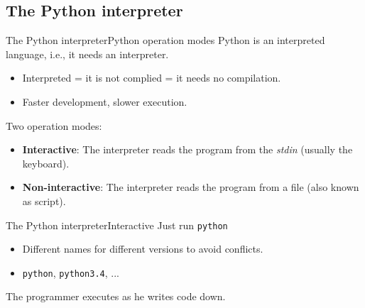 \documentclass[10pt,compress]{beamer} %
\begin{document}
\subsection{The Python interpreter}

\begin{frame}{The Python interpreter}{Python operation modes}
		Python is an interpreted language, i.e., it needs an interpreter.
			\begin{itemize}
				\item Interpreted = it is not complied = it needs no compilation.
				\item Faster development, slower execution.
			\end{itemize}
		Two operation modes:
			\begin{itemize}
				\item \textbf{Interactive}: The interpreter reads the program from the \textit{stdin} (usually the keyboard).
				\item \textbf{Non-interactive}: The interpreter reads the program from a file (also known as \alert{script}).
			\end{itemize}
\end{frame}

\begin{frame}{The Python interpreter}{Interactive}
		Just run \texttt{python}
			\begin{itemize}
				\item Different names for different versions to avoid conflicts.
				\item \texttt{python}, \texttt{python3.4}, ...
			\end{itemize}

		\vspace{-0.2cm}
		\begin{block}{}
		\vspace{-0.2cm}
			
		\end{block}
		The programmer executes as he writes code down.
\end{frame}
\end{document}
